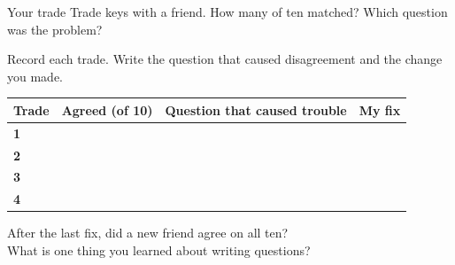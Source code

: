 \begin{puzzle}{Your trade}
Trade keys with a friend. How many of ten matched? \wline[1.6cm] Which question was the problem? \wline[4cm]
\end{puzzle}
\clearpage
\thispagestyle{fancy}
Record each trade. Write the question that caused disagreement and the change you made.\par\medskip
\renewcommand{\arraystretch}{3.0}
\begin{tabularx}{\linewidth}{|>{\sffamily\small\bfseries}p{1.8cm}|X|X|X|}
\hline
Trade & Agreed (of 10) & Question that caused trouble & My fix \\ \hline
1 & & & \\ \hline
2 & & & \\ \hline
3 & & & \\ \hline
4 & & & \\ \hline
\end{tabularx}

\vspace{8pt}
After the last fix, did a new friend agree on all ten? \wline[3cm]\\[10pt]
What is one thing you learned about writing questions? \wline[6cm]
\clearpage

